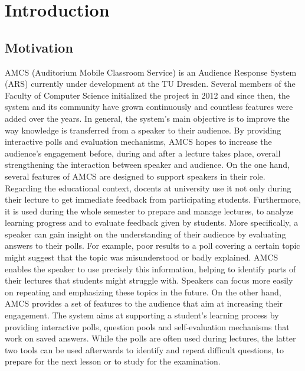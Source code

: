 
\chapter{Introduction}

\section{Motivation}


AMCS (Auditorium Mobile Classroom Service) is an Audience Response System (ARS) currently under development at the TU Dresden. Several members of the Faculty of Computer Science initialized the project in 2012 and since then, the system and its community have grown continuously and countless features were added over the years.
\newline
\newline
In general, the system's main objective is to improve the way knowledge is transferred from a speaker to their audience. By providing interactive polls and evaluation mechanisms, AMCS hopes to increase the audience's engagement before, during and after a lecture takes place, overall strengthening the interaction between speaker and audience.
\newline
\newline
On the one hand, several features of AMCS are designed to support speakers in their role. Regarding the educational context, docents at university use it not only during their lecture to get immediate feedback from participating students. Furthermore, it is used during the whole semester to prepare and manage lectures, to analyze learning progress and to evaluate feedback given by students. More specifically, a speaker can gain insight on the understanding of their audience by evaluating answers to their polls. For example, poor results to a poll covering a certain topic might suggest that the topic was misunderstood or badly explained. AMCS enables the speaker to use precisely this information, helping to identify parts of their lectures that students might struggle with. Speakers can focus more easily on repeating and emphasizing these topics in the future.
\newline
\newline
On the other hand, AMCS provides a set of features to the audience that aim at increasing their engagement.
The system aims at supporting a student's learning process by providing interactive polls, question pools and self-evaluation mechanisms that work on saved answers. While the polls are often used during lectures, the latter two tools can be used afterwards to identify and repeat difficult questions, to prepare for the next lesson or to study for the examination. 
